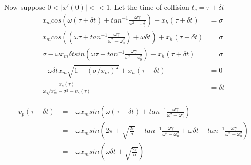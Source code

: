 \documentclass[xcolor=x11names,compress]{beamer}
\renewcommand{\(}{\begin{columns}}
\renewcommand{\)}{\end{columns}}
\newcommand{\<}[1]{\begin{column}{#1}}
\renewcommand{\>}{\end{column}}
\begin{document}
\begin{frame}
Now suppose $0<|x'(0)|<<1$.   
Let the time of collision $t_c=\tau+\delta t$
\begin{align*}
x_mcos\left(\omega (\tau+\delta t)+tan^{-1}\frac{\omega 
\gamma}{\omega^2-\omega_0^2}\right)+x_h(\tau+\delta t)&=\sigma\\
x_mcos\left(\left(\omega \tau+tan^{-1}\frac{\omega 
\gamma}{\omega^2-\omega_0^2}\right)+\omega \delta t\right)+x_h(\tau+\delta t)&=\sigma\\
\sigma-\omega x_m\delta t sin\left(\omega \tau+tan^{-1}\frac{\omega 
\gamma}{\omega^2-\omega_0^2}\right)+x_h(\tau+\delta t)&=\sigma\\
-\omega \delta tx_m\sqrt{1-(\sigma/x_m)^2}+x_h(\tau+\delta t)&=0\\
\frac{x_h(\tau)}{\omega\sqrt{x_m^2-\sigma^2}-v_h(\tau)}&=\delta t
\end{align*}
\end{frame}

\begin{frame}
\begin{align*}
v_p(\tau+\delta t)&=-\omega x_m sin\left( \omega (\tau+\delta t)+tan^{-1}\frac{\omega 
\gamma}{\omega^2-\omega_0^2}\right)\\
&=-\omega x_m sin\left( 
2\pi+\sqrt{\frac{2\varepsilon}{\sigma}}-tan^{-1}\frac{\omega 
\gamma}{\omega^2-\omega_0^2}+\omega \delta t + tan^{-1}\frac{\omega 
\gamma}{\omega^2-\omega_0^2} \right)\\
&=-\omega x_m sin\left(\omega\delta t+\sqrt{\frac{2\varepsilon}{\sigma}}\right) 
\end{align*}
\end{frame}
\end{document}
